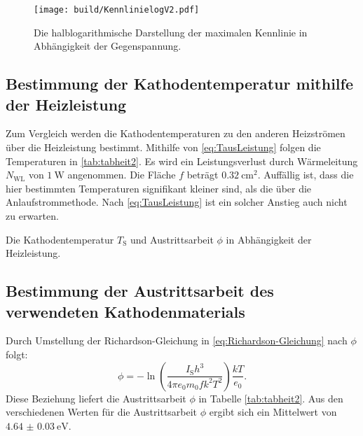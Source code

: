  \begin{figure}
  \centering
  \caption{Die halblogarithmische Darstellung der maximalen Kennlinie in Abhängigkeit der Gegenspannung.}
  \texttt{[image: build/KennlinielogV2.pdf]}
  \label{fig:Graphlog3}
 \end{figure}

\subsection{Bestimmung der Kathodentemperatur mithilfe der Heizleistung}
Zum Vergleich werden die Kathodentemperaturen zu den anderen Heizströmen über die Heizleistung bestimmt.
Mithilfe von \ref{eq:TausLeistung} folgen die Temperaturen in \ref{tab:tabheit2}. Es wird ein Leistungsverlust durch Wärmeleitung $N_\text{WL}$ von $\SI{1}{\watt}$ angenommen.
Die Fläche $f$ beträgt $\SI{0.32}{\centi\meter\squared}$.
Auffällig ist, dass die hier bestimmten Temperaturen signifikant kleiner sind,
als die über die Anlaufstrommethode. Nach \ref{eq:TausLeistung} ist ein solcher Anstieg auch nicht zu erwarten.

\begin{table}
 \centering
 \caption{Die Kathodentemperatur $T_\text{S}$ und Austrittsarbeit $\phi$ in Abhängigkeit der Heizleistung.}
 
 \label{tab:tabheit2}
\end{table}

\subsection{Bestimmung der Austrittsarbeit des verwendeten Kathodenmaterials}
Durch Umstellung der Richardson-Gleichung in \ref{eq:Richardson-Gleichung} nach
$\phi$ folgt:
\begin{equation}
  \phi = -\ln\left(\frac{I_\text{S} h^3}{4\pi e_0 m_0 f k^2 T^2}\right) \frac{k T}{e_0} \text{.}
\end{equation}
Diese Beziehung liefert die Austrittsarbeit $\phi$ in Tabelle \ref{tab:tabheit2}. Aus den verschiedenen Werten für die Austrittsarbeit $\phi$ ergibt sich ein Mittelwert von $\SI{4.64(3)}{\electronvolt}$.
